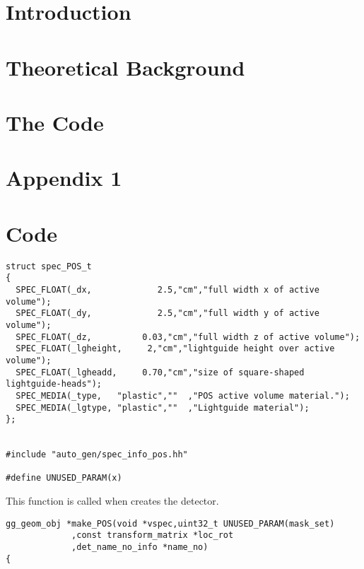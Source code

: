 
\tableofcontents
\clearpage

\pagestyle{scrheadings}
\ofoot[\pagemark]{\pagemark}
\cfoot[]{}

\setlength{\oddsidemargin}{8pt}
\setlength{\evensidemargin}{23pt}

%

\newpage
{}
\setcounter{page}{1}
\chapter{Introduction}
\label{sec:intro}


\chapter{Theoretical Background}
\label{sec:theory}

\chapter{The Code}
\label{sec:code}

%



\printnomenclature
{}


\newpage
\appendix
{}
\chapter{Appendix 1}
\label{app:brho}

\chapter{Code}
\label{app:code}

\lstset{language=C++ ,basicstyle=\footnotesize, breaklines=true, %
xleftmargin=11pt, xrightmargin=11pt
}
\begin{lstlisting}
struct spec_POS_t
{
  SPEC_FLOAT(_dx,             2.5,"cm","full width x of active volume");
  SPEC_FLOAT(_dy,             2.5,"cm","full width y of active volume");
  SPEC_FLOAT(_dz,          0.03,"cm","full width z of active volume");
  SPEC_FLOAT(_lgheight,     2,"cm","lightguide height over active volume");
  SPEC_FLOAT(_lgheadd,     0.70,"cm","size of square-shaped lightguide-heads");
  SPEC_MEDIA(_type,   "plastic",""  ,"POS active volume material.");
  SPEC_MEDIA(_lgtype, "plastic",""  ,"Lightguide material");
};


#include "auto_gen/spec_info_pos.hh"

#define UNUSED_PARAM(x)
\end{lstlisting}
This function is called when  creates the detector.
\begin{lstlisting}
gg_geom_obj *make_POS(void *vspec,uint32_t UNUSED_PARAM(mask_set)
		     ,const transform_matrix *loc_rot
		     ,det_name_no_info *name_no)
{
\end{lstlisting}


